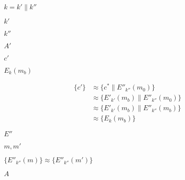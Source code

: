 \documentclass[10pt]{book}
\begin{document}
\begin{mdSnippets}
\begin{mdInlineSnippet}
$k = k' \| k''$\end{mdInlineSnippet}%
\begin{mdInlineSnippet}[d6a72fc99e4efef53dc8969ba2f042d2]%
$k'$\end{mdInlineSnippet}%
\begin{mdInlineSnippet}[39f01d0987cf7da77fe3454608e61ed9]%
$k''$\end{mdInlineSnippet}%
\begin{mdInlineSnippet}[37a12b78a9ca96989ad7ceceacb37ea2]%
$A'$\end{mdInlineSnippet}%
\begin{mdInlineSnippet}[12c7acffa10294560a339fa9f4796b80]%
$c'$\end{mdInlineSnippet}%
\begin{mdInlineSnippet}[53de0af50cfbd2486ba2b6fd5a8f586f]%
$E_k(m_b)$\end{mdInlineSnippet}%
\begin{mdDisplaySnippet}[2372f148bedefdfba3a961583d5d876f]%
\[%
\begin{aligned}
  \{ c' \} &\approx \{ c^* \| E''_{k''}(m_0) \} \\
  &\approx \{ E'_{k'}(m_b) \| E''_{k''}(m_0) \} \\
  &\approx \{ E'_{k'}(m_b) \| E''_{k''}(m_b) \} \\
  &\approx \{ E_k(m_b) \}
\end{aligned}
\]%
\end{mdDisplaySnippet}%
\begin{mdInlineSnippet}[a7ed12761a180ae1177b6afbbf39d3b3]%
$E''$\end{mdInlineSnippet}%
\begin{mdInlineSnippet}[67db24c9d6367e147ee325c66a0a5bac]%
$m,m'$\end{mdInlineSnippet}%
\begin{mdInlineSnippet}%
$\{E''_{k''}(m) \} \approx \{E''_{k''}(m')\}$\end{mdInlineSnippet}%
\begin{mdInlineSnippet}[7fc56270e7a70fa81a5935b72eacbe29]%
$A$\end{mdInlineSnippet}%
\begin{mdInlineSnippet}[c150726dc018e82825c0c3617f46a1c9]%

\end{mdInlineSnippet}
\end{mdSnippets}
\end{document}
